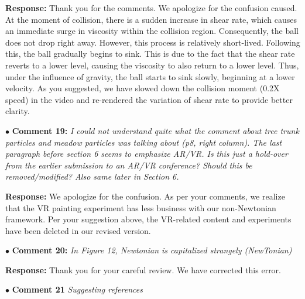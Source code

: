 \documentclass[12pt,a4paper]{article}
\begin{document}
\vspace{0.2cm}
\textbf{Response:}
Thank you for the comments. We apologize for the confusion caused. At the moment of collision, there is a sudden increase in shear rate, which causes an immediate surge in viscosity within the collision region. Consequently, the ball does not drop right away. However, this process is relatively short-lived. Following this, the ball gradually begins to sink. This is due to the fact that the shear rate reverts to a lower level, causing the viscosity to also return to a lower level. Thus, under the influence of gravity, the ball starts to sink slowly, beginning at a lower velocity. As you suggested, we have slowed down the collision moment (0.2X speed) in the video and re-rendered the variation of shear rate to provide better clarity.


\vspace{0.4cm}
\noindent$\bullet$ \enspace \textbf{Comment 19:}
\textit{I could not understand quite what the comment about tree trunk particles and meadow particles was talking about (p8, right column). The last paragraph before section 6 seems to emphasize AR/VR. Is this just a hold-over from the earlier submission to an AR/VR conference? Should this be removed/modified? Also same later in Section 6.  }

\vspace{0.2cm}
\textbf{Response:}
We apologize for the confusion. As per your comments, we realize that the VR painting experiment has less business with our non-Newtonian framework. Per your suggestion above, the VR-related content and experiments have been deleted in our revised version.


\vspace{0.4cm}
\noindent$\bullet$ \enspace \textbf{Comment 20:}
\textit{In Figure 12, Newtonian is capitalized strangely (NewTonian) }

\vspace{0.2cm}
\textbf{Response:}
Thank you for your careful review. We have corrected this error.


\vspace{0.4cm}
\noindent$\bullet$ \enspace \textbf{Comment 21}
\textit{Suggesting references}
\end{document}
